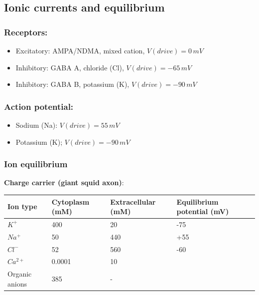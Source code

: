 \documentclass[a4paper, 12pt]{article}
\begin{document}
\subsection{Ionic currents and equilibrium}
\subsubsection{Receptors:}
\begin{itemize}[noitemsep,nolistsep]
	\item Excitatory: AMPA/NDMA, mixed cation, $V(drive) =0\,mV$
	\item Inhibitory: GABA A, chloride (Cl), $V(drive) =-65\,mV$
	\item Inhibitory: GABA B, potassium (K), $V(drive) =-90\,mV$
\end{itemize}
\subsubsection{Action potential:}
\begin{itemize}[noitemsep,nolistsep]
	\item Sodium (Na): $V(drive) = 55\,mV$
	\item Potassium (K); $V(drive) = -90\,mV$
\end{itemize}

\subsubsection{Ion equilibrium}
\textbf{Charge carrier (giant squid axon)}:\\
\begin{tabular}{|l|l|l|l|}
	\hline
	Ion type & Cytoplasm (mM) & Extracellular (mM) & Equilibrium potential (mV)\\\hline
	$K^+$ & 400 & 20 & -75 \\\hline
	$Na^+$ & 50 & 440 & +55\\\hline
	$Cl^-$ & 52 & 560 & -60\\\hline
	$Ca^{2+}$ & 0.0001 & 10 &\\\hline
	Organic anions & 385 & - &\\\hline
\end{tabular}
\begin{figure}[H]
	\centering
\end{figure}
\end{document}
